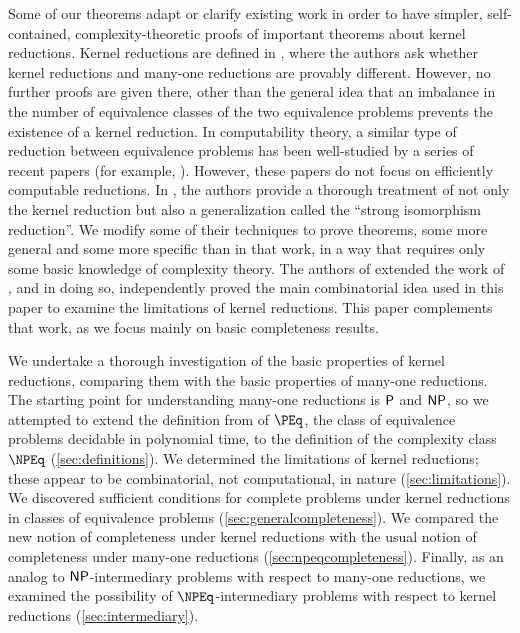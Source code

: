 Some of our theorems adapt or clarify existing work in order to have simpler, self-contained, complexity-theoretic proofs of important theorems about kernel reductions.
Kernel reductions are defined in \autocite{fg11}, where the authors ask whether kernel reductions and many-one reductions are provably different.
However, no further proofs are given there, other than the general idea that an imbalance in the number of equivalence classes of the two equivalence problems prevents the existence of a kernel reduction.
In computability theory, a similar type of reduction between equivalence problems has been well-studied by a series of recent papers (for example, \autocite{gg01, ff12, ffn12, chm12, imnn13, almnss14, mn14}).
However, these papers do not focus on efficiently computable reductions.
In \autocite{bcffm}, the authors provide a thorough treatment of not only the kernel reduction but also a generalization called the ``strong isomorphism reduction''.
We modify some of their techniques to prove theorems, some more general and some more specific than in that work, in a way that requires only some basic knowledge of complexity theory.
The authors of \autocite{gz14} extended the work of \autocite{bcffm}, and in doing so, independently proved the main combinatorial idea used in this paper to examine the limitations of kernel reductions.
This paper complements that work, as we focus mainly on basic completeness results.

We undertake a thorough investigation of the basic properties of kernel reductions, comparing them with the basic properties of many-one reductions.
The starting point for understanding many-one reductions is $\P$ and $\NP$, so we attempted to extend the definition from \autocite{fg11} of $\PEq$, the class of equivalence problems decidable in polynomial time, to the definition of the complexity class $\NPEq$ (\autoref{sec:definitions}).
We determined the limitations of kernel reductions; these appear to be combinatorial, not computational, in nature (\autoref{sec:limitations}).
We discovered sufficient conditions for complete problems under kernel reductions in classes of equivalence problems (\autoref{sec:generalcompleteness}).
We compared the new notion of completeness under kernel reductions with the usual notion of completeness under many-one reductions (\autoref{sec:npeqcompleteness}).
Finally, as an analog to $\NP$-intermediary problems with respect to many-one reductions, we examined the possibility of $\NPEq$-intermediary problems with respect to kernel reductions (\autoref{sec:intermediary}).
